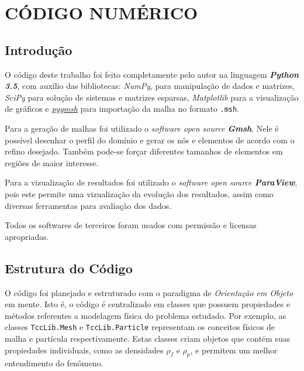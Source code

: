 \chapter{\textbf{CÓDIGO NUMÉRICO}}
\label{sec_codigo}

\section{\textbf{Introdução}}
O código deste trabalho foi feito completamente pelo autor na linguagem \textbf{\textit{Python 3.5}}, com auxílio das bibliotecas: \textit{NumPy}, para manipulação de dados e matrizes, \textit{SciPy} para solução de sistemas e matrizes esparsas, \textit{Matplotlib} para a visualização de gráficos e \href{https://github.com/nschloe/pygmsh}{\textit{pygmsh}} para importação da malha no formato \verb|.msh|.

Para a geração de malhas foi utilizado o \textit{software open source \textbf{Gmsh}}.
Nele é possível desenhar o perfil do domínio e gerar os nós e elementos de acordo com o refino desejado.
Também pode-se forçar diferentes tamanhos de elementos em regiões de maior interesse.

Para a vizualização de resultados foi utilizado o \textit{software open source \textbf{ParaView}}, pois este permite uma vizualização da evolução dos resultados, assim como diversas ferramentas para avaliação dos dados.

Todos os softwares de terceiros foram usados com permissão e licensas apropriadas.

\section{\textbf{Estrutura do Código}}
O código foi planejado e estruturado com o paradigma de \textit{Orientação em Objeto} em mente.
Isto é, o código é centralizado em classes que possuem propiedades e métodos referentes a modelagem física do problema estudado.
Por exemplo, as classes \verb|TccLib.Mesh| e \verb|TccLib.Particle| representam os conceitos físicos de malha e partícula respectivamente.
Estas classes criam objetos que contém suas propiedades individuais, como as densidades $\rho_f$ e $\rho_p$, e permitem um melhor entendimento do fenômeno.


